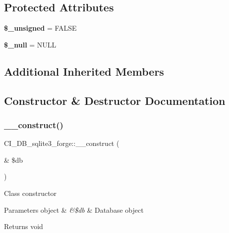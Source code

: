 \subsection*{Protected Attributes}
\begin{DoxyCompactItemize}
\item 
\mbox{\label{class_c_i___d_b__sqlite3__forge_aec15069a27641873274d8819dc3798b1}} 
{\bfseries \$\+\_\+unsigned} = F\+A\+L\+SE
\item 
\mbox{\label{class_c_i___d_b__sqlite3__forge_a68c9ef114782277596f311086d54fa72}} 
{\bfseries \$\+\_\+null} = \textquotesingle{}N\+U\+LL\textquotesingle{}
\end{DoxyCompactItemize}
\subsection*{Additional Inherited Members}


\subsection{Constructor \& Destructor Documentation}
\mbox{\label{class_c_i___d_b__sqlite3__forge_ae4f0df91d663be57c00fdcdef8e4c71b}} 
\subsubsection{\texorpdfstring{\+\_\+\+\_\+construct()}{\_\_construct()}}
{\footnotesize\ttfamily C\+I\+\_\+\+D\+B\+\_\+sqlite3\+\_\+forge\+::\+\_\+\+\_\+construct (\begin{DoxyParamCaption}\item[{\&}]{\$db }\end{DoxyParamCaption})}

Class constructor


\begin{DoxyParams}[1]{Parameters}
object & {\em \&\$db} & Database object \\
\hline
\end{DoxyParams}
\begin{DoxyReturn}{Returns}
void 
\end{DoxyReturn}


